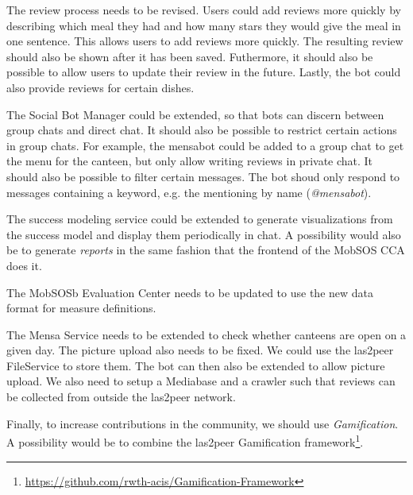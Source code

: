 The review process needs to be revised. Users could add reviews more quickly by describing which meal they had and how many stars they would give the meal in one sentence. This allows users to add reviews more quickly. The resulting review should also be shown after it has been saved. Futhermore, it should also be possible to allow users to update their review in the future. Lastly, the bot could also provide reviews for certain dishes.

The Social Bot Manager could be extended, so that bots can discern between group chats and direct chat. It should also be possible to restrict certain actions in group chats. For example, the mensabot could be added to a group chat to get the menu for the canteen, but only allow writing reviews in private chat.
It should also be possible to filter certain messages. The bot shoud only respond to messages containing a keyword, e.g. the mentioning by name (\emph{@mensabot}).

The success modeling service could be extended to generate visualizations from the success model and display them periodically in chat. A possibility would also be to generate \emph{reports} in the same fashion that the frontend of the MobSOS CCA does it. 

The MobSOSb Evaluation Center needs to be updated to use the new data format for measure definitions.

The Mensa Service needs to be extended to check whether canteens are open on a given day. The picture upload also needs to be fixed. We could use the las2peer FileService to store them. The bot can then also be extended to allow picture upload. 
We also need to setup a Mediabase and a crawler such that reviews can be collected from outside the las2peer network. 

Finally, to increase contributions in the community, we should use \emph{Gamification}. A possibility would be to combine the las2peer Gamification framework\footnote{\url{https://github.com/rwth-acis/Gamification-Framework}}.